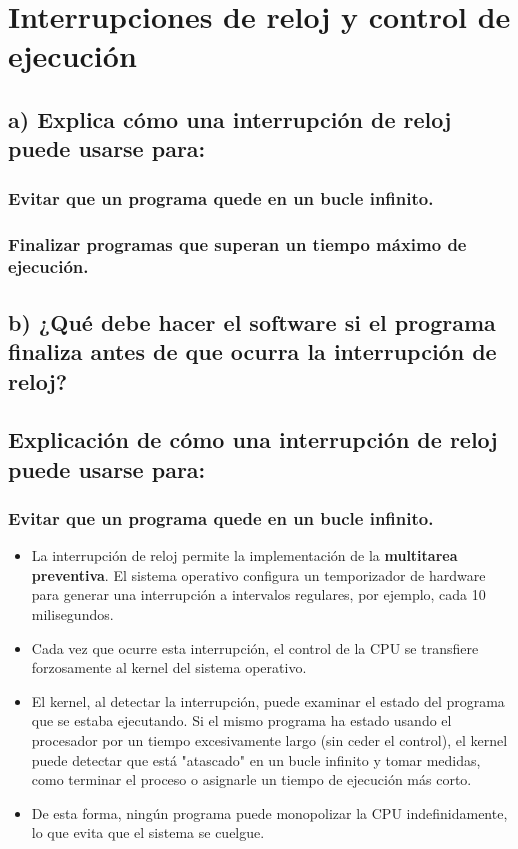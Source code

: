 \documentclass{article}
\begin{document}
{{ \section{Interrupciones de reloj y control de ejecución}

\subsection*{a) Explica cómo una interrupción de reloj puede usarse para:}
\subsubsection*{Evitar que un programa quede en un bucle infinito.}
\subsubsection*{Finalizar programas que superan un tiempo máximo de ejecución.}

\subsection*{b) ¿Qué debe hacer el software si el programa finaliza antes de que ocurra la interrupción de reloj?}


\subsection{ Explicación de  cómo una interrupción de reloj puede usarse para:}

\subsubsection*{Evitar que un programa quede en un bucle infinito.}
\begin{itemize}
    \item La interrupción de reloj permite la implementación de la \textbf{multitarea preventiva}. El sistema operativo configura un temporizador de hardware para generar una interrupción a intervalos regulares, por ejemplo, cada 10 milisegundos.
    \item Cada vez que ocurre esta interrupción, el control de la CPU se transfiere forzosamente al kernel del sistema operativo.
    \item El kernel, al detectar la interrupción, puede examinar el estado del programa que se estaba ejecutando. Si el mismo programa ha estado usando el procesador por un tiempo excesivamente largo (sin ceder el control), el kernel puede detectar que está "atascado" en un bucle infinito y tomar medidas, como terminar el proceso o asignarle un tiempo de ejecución más corto.
    \item De esta forma, ningún programa puede monopolizar la CPU indefinidamente, lo que evita que el sistema se cuelgue.
\end{itemize}

}}
\end{document}
